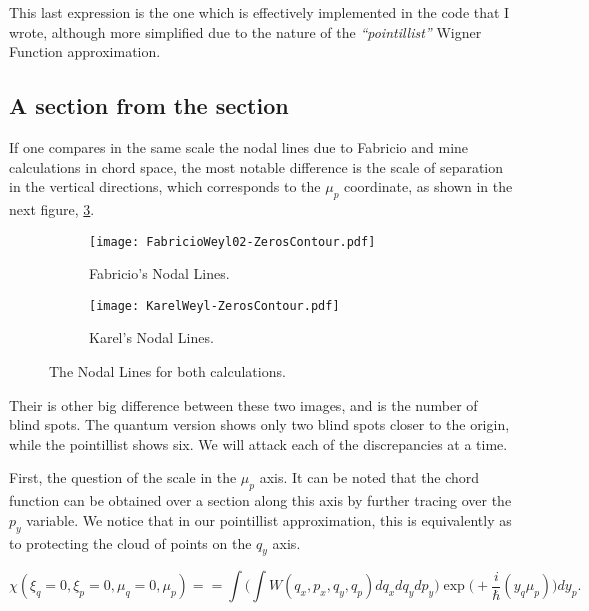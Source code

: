 \documentclass[a4paper,12pt]{article}
\newcommand{\ihb}{\frac{i}{\hbar}}
\begin{document}
This last expression is the one which is effectively implemented in the
code that I wrote, although more simplified due to the nature
of the \emph{``pointillist''} Wigner Function approximation.

\subsection{A section from the section}

If one compares in the same scale the nodal lines due to 
Fabricio and mine calculations in chord space,
the most notable difference is the scale of
separation in the vertical directions, which corresponds
to the $\mu_p$ coordinate, as shown in the next figure,
\ref{comparacionzeros01}. 

\begin{figure}[H]
  \centering
  \begin{subfigure}[b]{0.45\textwidth}
    \centering
          \texttt{[image: FabricioWeyl02-ZerosContour.pdf]}
                \caption{Fabricio's Nodal Lines.}
                \label{FabZeros}
  \end{subfigure}%
\begin{subfigure}[b]{0.45\textwidth}
    \centering
          \texttt{[image: KarelWeyl-ZerosContour.pdf]}
                \caption{Karel's Nodal Lines.}
                \label{KarelZeros}
  \end{subfigure}%
\caption{The Nodal Lines for both calculations. }\label{comparacionzeros01}
\end{figure}

Their is other big difference between these two images, and is
the number of blind spots. The quantum version shows only two
blind spots closer to the origin, while the pointillist
shows six. We will attack each of the discrepancies at a time.

First, the question of the scale in the $\mu_p$ axis.
It can be noted that the chord function can be obtained over
a section along this axis by further tracing over
the $p_y$ variable. We notice that in our pointillist
approximation, this is equivalently as to protecting
the cloud of points on the $q_y$ axis. 


\begin{equation}
\chi(\xi_q=0, \xi_p=0, \mu_q=0, \mu_p)  = 
  =  \int   \Biggl( \int W(q_x, p_x, q_y, q_p) dq_x dq_y dp_y \Biggr) 
\exp  \bigl(+\ihb (y_q \mu_p ) \bigr) d y_p.
\end{equation}
\end{document}
